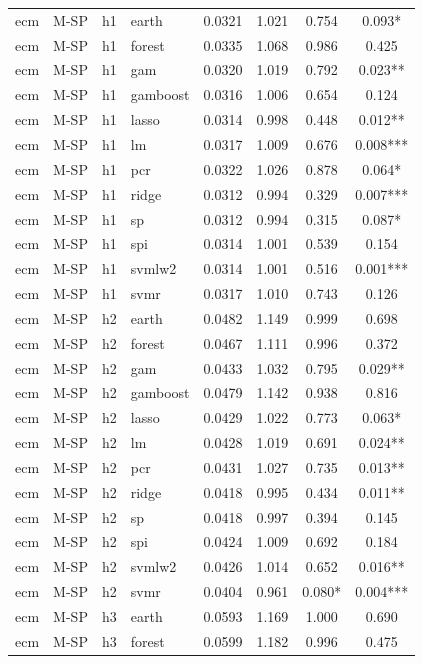 \begin{ThreePartTable}
\begin{longtable}[t]{llclcccc}
\addlinespace
ecm & M-SP & h1 & earth & 0.0321 & 1.021 & 0.754 & 0.093*\\
ecm & M-SP & h1 & forest & 0.0335 & 1.068 & 0.986 & 0.425\\
ecm & M-SP & h1 & gam & 0.0320 & 1.019 & 0.792 & 0.023**\\
ecm & M-SP & h1 & gamboost & 0.0316 & 1.006 & 0.654 & 0.124\\
ecm & M-SP & h1 & lasso & 0.0314 & 0.998 & 0.448 & 0.012**\\
ecm & M-SP & h1 & lm & 0.0317 & 1.009 & 0.676 & 0.008***\\
ecm & M-SP & h1 & pcr & 0.0322 & 1.026 & 0.878 & 0.064*\\
ecm & M-SP & h1 & ridge & 0.0312 & 0.994 & 0.329 & 0.007***\\
ecm & M-SP & h1 & sp & 0.0312 & 0.994 & 0.315 & 0.087*\\
ecm & M-SP & h1 & spi & 0.0314 & 1.001 & 0.539 & 0.154\\
ecm & M-SP & h1 & svmlw2 & 0.0314 & 1.001 & 0.516 & 0.001***\\
ecm & M-SP & h1 & svmr & 0.0317 & 1.010 & 0.743 & 0.126\\
\addlinespace
ecm & M-SP & h2 & earth & 0.0482 & 1.149 & 0.999 & 0.698\\
ecm & M-SP & h2 & forest & 0.0467 & 1.111 & 0.996 & 0.372\\
ecm & M-SP & h2 & gam & 0.0433 & 1.032 & 0.795 & 0.029**\\
ecm & M-SP & h2 & gamboost & 0.0479 & 1.142 & 0.938 & 0.816\\
ecm & M-SP & h2 & lasso & 0.0429 & 1.022 & 0.773 & 0.063*\\
ecm & M-SP & h2 & lm & 0.0428 & 1.019 & 0.691 & 0.024**\\
ecm & M-SP & h2 & pcr & 0.0431 & 1.027 & 0.735 & 0.013**\\
ecm & M-SP & h2 & ridge & 0.0418 & 0.995 & 0.434 & 0.011**\\
ecm & M-SP & h2 & sp & 0.0418 & 0.997 & 0.394 & 0.145\\
ecm & M-SP & h2 & spi & 0.0424 & 1.009 & 0.692 & 0.184\\
ecm & M-SP & h2 & svmlw2 & 0.0426 & 1.014 & 0.652 & 0.016**\\
ecm & M-SP & h2 & svmr & 0.0404 & 0.961 & 0.080* & 0.004***\\
\addlinespace
ecm & M-SP & h3 & earth & 0.0593 & 1.169 & 1.000 & 0.690\\
ecm & M-SP & h3 & forest & 0.0599 & 1.182 & 0.996 & 0.475\\

\end{longtable}
\end{ThreePartTable}
